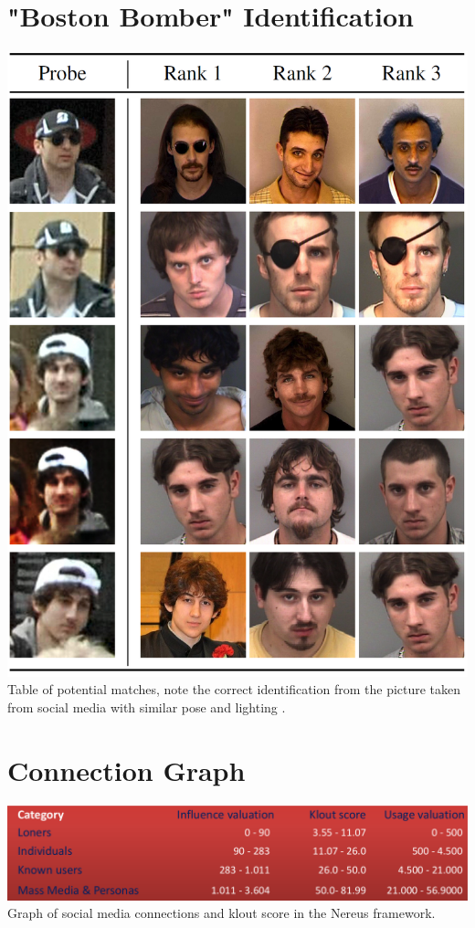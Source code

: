 \documentclass[12pt]{article}
\begin{document}
\begin{appendices}
\section{"Boston Bomber" Identification}
\label{appendix:bostonbomber}
\includegraphics[scale=0.8]{res/boston_bomber.png}
Table of potential matches, note the correct identification from the picture taken from social media with similar pose and lighting \citep{bostonbombingcasestudy}.

\section{Connection Graph}
\label{appendix:connectiongraph}
\includegraphics[width=\linewidth]{res/connection_klout.png}
Graph of social media connections and klout score in the Nereus framework\citep{behaviourdetection}.


\end{appendices}
\end{document}
